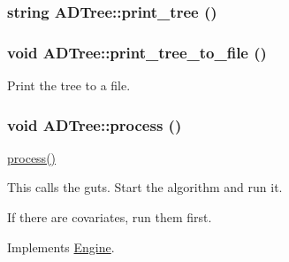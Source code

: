 \hypertarget{classADTree_a9b3d523c53bbfffe1988d72fb9791c87}{
\subsubsection[{print\_\-tree}]{\setlength{\rightskip}{0pt plus 5cm}string ADTree::print\_\-tree ()}}
\label{classADTree_a9b3d523c53bbfffe1988d72fb9791c87}
\hypertarget{classADTree_abb780d1ef5e6d66128dc990ce0189554}{
\subsubsection[{print\_\-tree\_\-to\_\-file}]{\setlength{\rightskip}{0pt plus 5cm}void ADTree::print\_\-tree\_\-to\_\-file ()}}
\label{classADTree_abb780d1ef5e6d66128dc990ce0189554}
Print the tree to a file. \hypertarget{classADTree_acbdd5c7a248305933868e00bd875fd33}{
\subsubsection[{process}]{\setlength{\rightskip}{0pt plus 5cm}void ADTree::process ()}}
\label{classADTree_acbdd5c7a248305933868e00bd875fd33}
\hyperlink{classADTree_acbdd5c7a248305933868e00bd875fd33}{process()}

This calls the guts. Start the algorithm and run it.

If there are covariates, run them first. 

Implements \hyperlink{classEngine_a005f8e277c3dea16ea05803fba223db7}{Engine}.

